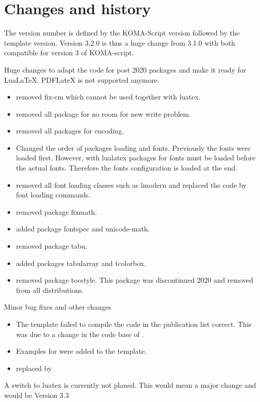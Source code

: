 
\chapter{Changes and history}
\label{appendix:doc:changes}

The version number is defined by the KOMA-Script version followed by the template version. 
Version 3.2.0 is thus a huge change from 3.1.0 with both compatible for version 3 of KOMA-script.

Huge changes to adapt the code for post 2020 packages and make it ready for LuaLaTeX. PDFLateX is not supported anymore.
\begin{itemize}
	\item removed fix-cm which cannot be used together with luatex.
	\item removed all package for no room for new write problem.
	\item removed all packages for encoding.
	\item Changed the order of packages loading and fonts. Previously the fonts were loaded first.
	However, with lualatex packages for fonts must be loaded before the actual fonts. Therefore the fonts configuration is loaded at the end.
	\item removed all font loading classes such as lmodern and replaced the code by font loading commands.
	\item removed package fixmath.
	\item added package fontspec and unicode-math.
	\item removed package tabu.
	\item added packages tabularray and tcolorbox.
	\item removed package tocstyle. This package was discontinued 2020 and removed from all distributions.
\end{itemize}


Minor bug fixes and other changes
\begin{itemize}
	\item The template failed to compile the  code in the publication list correct. This was due to a change in the code base of .
	\item Examples for  were added to the template.
	\item replaced  by 
\end{itemize}
A switch to luatex is currently not planed. This would mean a major change and would be Version 3.3

